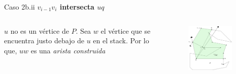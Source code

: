 \documentclass[aspectratio=169,xcolor=dvipsnames, t]{beamer}
\begin{document}
\begin{frame}{Caso 2b.ii}
    \textbf{$v_{i-1}v_{i}$ intersecta $uq$}\\
    \vspace{0.5cm}
    \begin{columns}
    \begin{column}{0.45\textwidth}
    $u$ no es un vértice de $P$. Sea $w$ el vértice que se encuentra justo debajo de $u$ en el stack. Por lo que, $uw$ es una \textit{arista construida}\\
    \vspace{0.5cm}
    \end{column}
    \begin{column}{0.45\textwidth}  %
    \vspace{-3cm}
        \begin{figure}
            \centering
            \includegraphics[width=0.85\textwidth]{imagenes/Caso2.7a.png}
        \end{figure}
    \end{column}
    \end{columns}
\end{frame}

\end{document}

